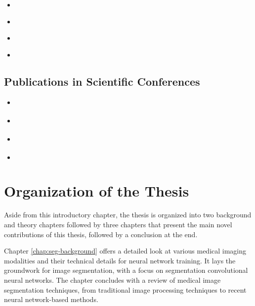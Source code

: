 \begin{itemize}
	\item \cite{bencevicTrainingPolarImage2021} 
	\item \cite{bencevicRecentProgressEpicardial2022} 
	\item \cite{bencevicSegmentthenSegmentContextPreservingCropBased2023a} 
	\item \cite{bencevicUnderstandingSkinColor2024} 
\end{itemize}

\subsection{Publications in Scientific Conferences}

\begin{itemize}
	\item \cite{bencevicEpicardialAdiposeTissue2021} 
	\item \cite{bencevicUsingPolarTransform2022a} 
	\item \cite{bencevicSelfsupervisedLearningMeans2022} 
	\item \cite{verchevalCounterfactualFunctionalConnectomes2023} 
\end{itemize}


\section{Organization of the Thesis}

Aside from this introductory chapter, the thesis is organized into two background and theory chapters followed by three chapters that present the main novel contributions of this thesis, followed by a conclusion at the end.

Chapter \ref{chap:seg-background} offers a detailed look at various medical imaging modalities and their technical details for neural network training. It lays the groundwork for image segmentation, with a focus on segmentation convolutional neural networks. The chapter concludes with a review of medical image segmentation techniques, from traditional image processing techniques to recent neural network-based methods.

